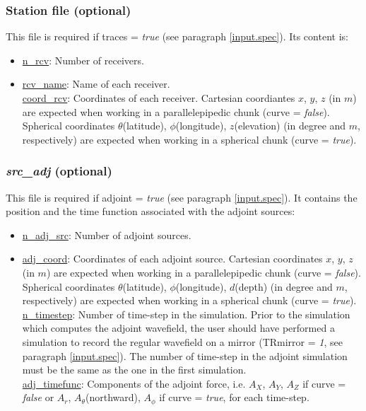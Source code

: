 \subsubsection{Station file (optional)}
\label{stafile}

This file is required if traces = \textit{true} (see paragraph \ref{input.spec}). Its content is:

\renewcommand{\labelitemii}{}
\begin{itemize}[topsep=2pt,itemsep=10pt]

\item\underline{n\_rcv}: Number of receivers.

\item\underline{rcv\_name}: Name of each receiver.\\
\underline{coord\_rcv}: Coordinates of each receiver.
Cartesian coordiantes $x$, $y$, $z$ (in $m$) are expected when working in a parallelepipedic chunk (curve = 
\textit{false}). Spherical coordinates $\theta$(latitude), $\phi$(longitude), $z$(elevation) (in degree and
$m$, respectively) are expected when working in a spherical chunk (curve = \textit{true}).
 
\end{itemize}


\subsubsection{\textit{src\_adj} (optional)}
\label{src_adj_file}

This file is required if adjoint = \textit{true} (see paragraph \ref{input.spec}). It contains the position
and the time function associated with the adjoint sources:

\renewcommand{\labelitemii}{}
\begin{itemize}[topsep=2pt,itemsep=10pt]

\item\underline{n\_adj\_src}: Number of adjoint sources.

\item\underline{adj\_coord}: Coordinates of each adjoint source.
Cartesian coordinates $x$, $y$, $z$ (in $m$) are expected when working in a parallelepipedic chunk (curve =
\textit{false}). Spherical coordinates $\theta$(latitude), $\phi$(longitude), $d$(depth) (in degree and
$m$, respectively) are expected when working in a spherical chunk (curve = \textit{true}).\\
\underline{n\_timestep}: Number of time-step in the simulation. Prior to the simulation which computes the
adjoint wavefield, the user should have performed a simulation to record the regular wavefield on a mirror
(TRmirror = \textit{1}, see paragraph \ref{input.spec}).  The number of time-step in the adjoint simulation
must be the same as the one in the first simulation.\\
\underline{adj\_timefunc}: Components of the adjoint force, i.e. $A_X$, $A_Y$, $A_Z$ if curve =
\textit{false} or $A_r$, $A_\theta$(northward), $A_\phi$ if curve = \textit{true}, for each time-step.

\end{itemize}




